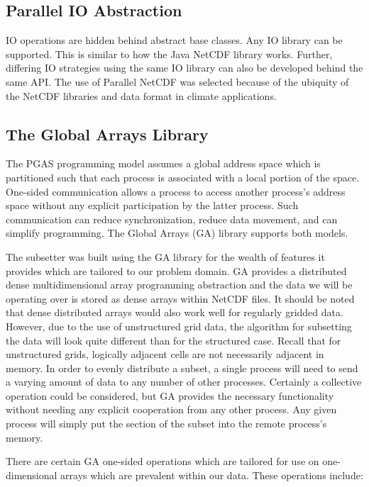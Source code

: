 \subsection{Parallel IO Abstraction}

IO operations are hidden behind abstract base classes.  Any IO library can be
supported.  This is similar to how the Java NetCDF library
works\cite{JavaNetCDF}.  Further, differing IO strategies using the same IO
library can also be developed behind the same API.  The use of Parallel NetCDF
was selected because of the ubiquity of the NetCDF libraries and data format
in climate applications.

\subsection{The Global Arrays Library}

The PGAS programming model assumes a global address space which is partitioned
such that each process is associated with a local portion of the space.
One-sided communication allows a process to access another process's address
space without any explicit participation by the latter process.  Such
communication can reduce synchronization, reduce data movement, and can
simplify programming.  The Global Arrays (GA) library supports both models.

The subsetter was built using the GA library for the wealth of features it
provides which are tailored to our problem domain.  GA provides a distributed
dense multidimensional array programming abstraction and the data we will be
operating over is stored as dense arrays within NetCDF files.  It should be
noted that dense distributed arrays would also work well for regularly gridded
data.  However, due to the use of unstructured grid data, the algorithm for
subsetting the data will look quite different than for the structured case.
Recall that for unstructured grids, logically adjacent cells are not
necessarily adjacent in memory.  In order to evenly distribute a subset, a
single process will need to send a varying amount of data to any number of
other processes.  Certainly a collective operation could be considered, but GA
provides the necessary functionality without needing any explicit cooperation
from any other process.  Any given process will simply put the section of the
subset into the remote process's memory.

There are certain GA one-sided operations which are tailored for use on
one-dimensional arrays which are prevalent within our data.  These operations
include:

